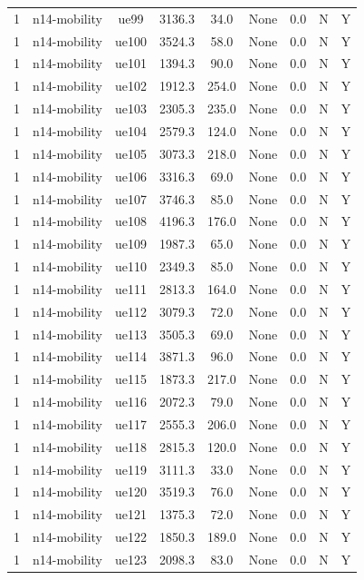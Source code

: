 \begin{table}[ht]
\begin{tabular}{|c|c|c|c|c|c|c|c|c|}
1 & n14-mobility & ue99 & 3136.3 & 34.0 & None & 0.0 & N & Y \\
1 & n14-mobility & ue100 & 3524.3 & 58.0 & None & 0.0 & N & Y \\
1 & n14-mobility & ue101 & 1394.3 & 90.0 & None & 0.0 & N & Y \\
1 & n14-mobility & ue102 & 1912.3 & 254.0 & None & 0.0 & N & Y \\
1 & n14-mobility & ue103 & 2305.3 & 235.0 & None & 0.0 & N & Y \\
1 & n14-mobility & ue104 & 2579.3 & 124.0 & None & 0.0 & N & Y \\
1 & n14-mobility & ue105 & 3073.3 & 218.0 & None & 0.0 & N & Y \\
1 & n14-mobility & ue106 & 3316.3 & 69.0 & None & 0.0 & N & Y \\
1 & n14-mobility & ue107 & 3746.3 & 85.0 & None & 0.0 & N & Y \\
1 & n14-mobility & ue108 & 4196.3 & 176.0 & None & 0.0 & N & Y \\
1 & n14-mobility & ue109 & 1987.3 & 65.0 & None & 0.0 & N & Y \\
1 & n14-mobility & ue110 & 2349.3 & 85.0 & None & 0.0 & N & Y \\
1 & n14-mobility & ue111 & 2813.3 & 164.0 & None & 0.0 & N & Y \\
1 & n14-mobility & ue112 & 3079.3 & 72.0 & None & 0.0 & N & Y \\
1 & n14-mobility & ue113 & 3505.3 & 69.0 & None & 0.0 & N & Y \\
1 & n14-mobility & ue114 & 3871.3 & 96.0 & None & 0.0 & N & Y \\
1 & n14-mobility & ue115 & 1873.3 & 217.0 & None & 0.0 & N & Y \\
1 & n14-mobility & ue116 & 2072.3 & 79.0 & None & 0.0 & N & Y \\
1 & n14-mobility & ue117 & 2555.3 & 206.0 & None & 0.0 & N & Y \\
1 & n14-mobility & ue118 & 2815.3 & 120.0 & None & 0.0 & N & Y \\
1 & n14-mobility & ue119 & 3111.3 & 33.0 & None & 0.0 & N & Y \\
1 & n14-mobility & ue120 & 3519.3 & 76.0 & None & 0.0 & N & Y \\
1 & n14-mobility & ue121 & 1375.3 & 72.0 & None & 0.0 & N & Y \\
1 & n14-mobility & ue122 & 1850.3 & 189.0 & None & 0.0 & N & Y \\
1 & n14-mobility & ue123 & 2098.3 & 83.0 & None & 0.0 & N & Y \\

\end{tabular}
\end{table}
